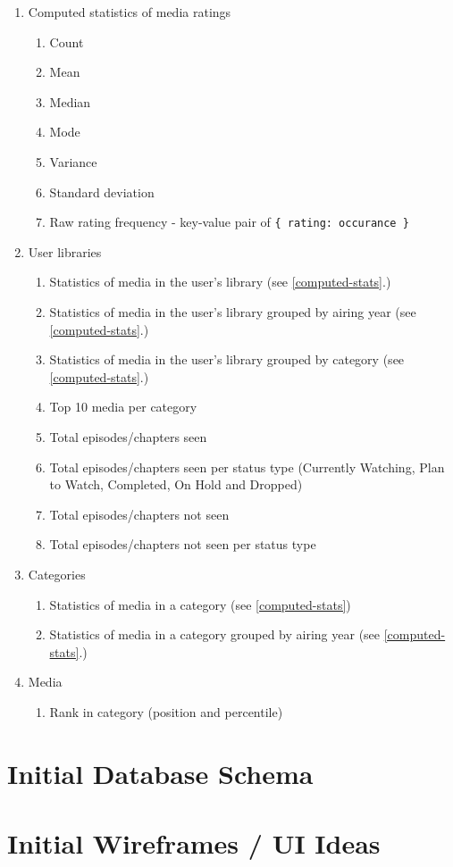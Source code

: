 \begin{enumerate}
  \item\label{computed-stats} Computed statistics of media ratings
    \begin{enumerate}
      \item Count
      \item Mean
      \item Median
      \item Mode
      \item Variance
      \item Standard deviation
      \item Raw rating frequency - key-value pair of \texttt{\{ rating: occurance \}}
    \end{enumerate}
  \item User libraries
    \begin{enumerate}
      \item Statistics of media in the user's library (see \ref{computed-stats}.)
      \item Statistics of media in the user's library grouped by airing year (see \ref{computed-stats}.)
      \item Statistics of media in the user's library grouped by category (see \ref{computed-stats}.)
      \item Top 10 media per category
      \item Total episodes/chapters seen
      \item Total episodes/chapters seen per status type (Currently Watching, Plan to Watch, Completed, On Hold and Dropped)
      \item Total episodes/chapters not seen
      \item Total episodes/chapters not seen per status type
    \end{enumerate}
  \item Categories
    \begin{enumerate}
      \item Statistics of media in a category (see \ref{computed-stats})
      \item Statistics of media in a category grouped by airing year (see \ref{computed-stats}.)
    \end{enumerate}
  \item Media
    \begin{enumerate}
      \item Rank in category (position and percentile)
    \end{enumerate}
\end{enumerate}

\section{Initial Database Schema}

\section{Initial Wireframes / UI Ideas}
